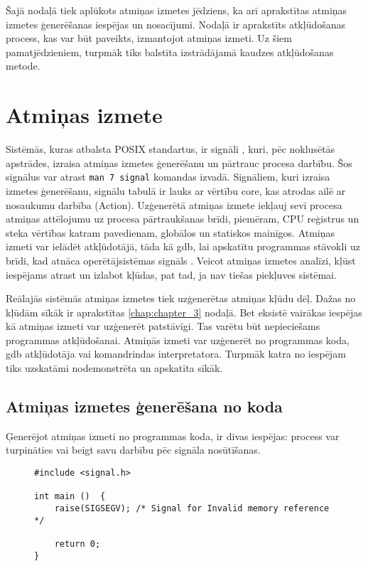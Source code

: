 ﻿Šajā nodaļā tiek aplūkots atmiņas izmetes jēdziens, ka arī aprakstītas atmiņas izmetes ģenerēšanas iespējas un nosacījumi.
Nodaļā ir aprakstīts atkļūdošanas process, kas var būt paveikts, izmantojot atmiņas izmeti.
Uz šiem pamatjēdzieniem, turpmāk tiks balstīta izstrādājamā kaudzes atkļūdošanas metode.
\section{Atmiņas izmete}

Sistēmās, kuras atbalsta POSIX standartus, ir signāli \cite{USP}, kuri, pēc noklusētās apstrādes, izraisa atmiņas izmetes ģenerēšanu un pārtrauc procesa darbību. 
Šos signālus var atrast  \texttt{man 7 signal} komandas izvadā. 
Signāliem, kuri izraisa izmetes ģenerēšanu, signālu tabulā \cite{signal} ir lauks ar vērtību core, kas atrodas ailē ar nosaukumu darbība (Action). 
Uzģenerētā atmiņas izmete iekļauj sevī procesa atmiņas attēlojumu uz procesa pārtraukšanas brīdi, piemēram, CPU reģistrus un steka vērtības katram pavedienam, globālos un statiskos mainīgos. 
Atmiņas izmeti var ielādēt atkļūdotājā, tāda kā gdb, lai  apskatītu programmas stāvokli uz brīdi, kad atnāca operētājsistēmas signāls \cite{core}.
Veicot atmiņas izmetes analīzi, kļūst iespējams atrast un izlabot kļūdas, pat tad, ja nav tiešas piekļuves sistēmai. 


Reālajās sistēmās atmiņas izmetes tiek uzģenerētas atmiņas kļūdu dēļ. 
Dažas no kļūdām sīkāk ir aprakstītas \ref{chap:chapter_3} nodaļā. 
Bet eksistē vairākas iespējas kā atmiņas izmeti var uzģenerēt patstāvīgi.
Tas varētu būt nepieciešams programmas atkļūdošanai.
Atmiņās izmeti var uzģenerēt no programmas koda,  gdb atkļūdotāja vai komandrindas interpretatora.
Turpmāk katra no iespējam tiks uzskatāmi nodemonstrēta un apskatīta sīkāk.

\subsection{Atmiņas izmetes ģenerēšana no koda}

Ģenerējot atmiņas izmeti no programmas koda, ir divas iespējas: process var turpināties vai beigt savu darbību pēc signāla nosūtīšanas.

\begin{figure}[h]
\begin{lstlisting}
#include <signal.h>

int main ()  {
    raise(SIGSEGV); /* Signal for Invalid memory reference */
	
    return 0;
}
\end{lstlisting}
\caption{\textbf{\fontsize{11}{12}\selectfont {Atmiņas izmetes ģenerēšana, pārtraucot procesa darbību}}}
\end{figure}

